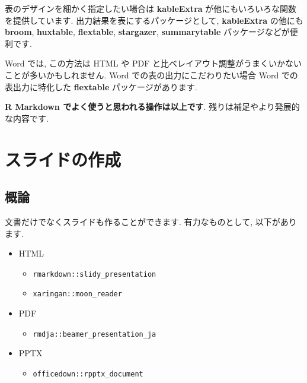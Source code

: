 \documentclass[
]{ltjsarticle}
\providecommand{\tightlist}{%
  \setlength{\itemsep}{0pt}\setlength{\parskip}{0pt}}
\newenvironment{infobox}[1]{\begin{itemize}\renewcommand{\labelitemi}{\raisebox{-.7\height}[0pt][0pt]{%
  {\setkeys{Gin}{width=3em,keepaspectratio}\texttt{[image: \_latex/\_img/\#1]}}}}
  \setlength{\fboxsep}{1em}
  \begin{greyblock}
  \item
  }{\end{greyblock}\end{itemize}
}
\begin{document}
表のデザインを細かく指定したい場合は \textbf{kableExtra} が他にもいろいろな関数を提供しています. 出力結果を表にするパッケージとして, \textbf{kableExtra} の他にも \textbf{broom}, \textbf{huxtable}, \textbf{flextable}, \textbf{stargazer}, \textbf{summarytable} パッケージなどが便利です.

\begin{infobox}{important}
Word では, この方法は HTML や PDF と比べレイアウト調整がうまくいかないことが多いかもしれません. Word での表の出力にこだわりたい場合 Word での表出力に特化した \textbf{flextable} パッケージがあります.

\end{infobox}

\begin{infobox}{important}
\textbf{R Markdown でよく使うと思われる操作は以上です}. 残りは補足やより発展的な内容です.

\end{infobox}

\hypertarget{slides}{%
\section{スライドの作成}\label{slides}}

\hypertarget{ux6982ux8ad6}{%
\subsection{概論}\label{ux6982ux8ad6}}

文書だけでなくスライドも作ることができます. 有力なものとして, 以下があります.

\begin{itemize}
\tightlist
\item
  HTML

  \begin{itemize}
  \tightlist
  \item
    \texttt{rmarkdown::slidy\_presentation}
  \item
    \texttt{xaringan::moon\_reader}
  \end{itemize}
\item
  PDF

  \begin{itemize}
  \tightlist
  \item
    \texttt{rmdja::beamer\_presentation\_ja}
  \end{itemize}
\item
  PPTX

  \begin{itemize}
  \tightlist
  \item
    \texttt{officedown::rpptx\_document}
  \end{itemize}
\end{itemize}
\end{document}
